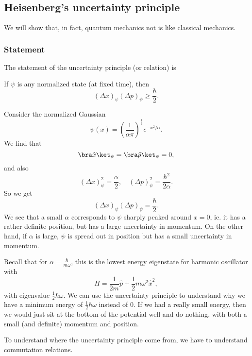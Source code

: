\documentclass[a4paper]{article}
\begin{document}
\subsection{Heisenberg's uncertainty principle}
We will show that, in fact, quantum mechanics not is like classical mechanics.

\subsubsection*{Statement}
The statement of the uncertainty principle (or relation) is
\begin{thm}
  If $\psi$ is any normalized state (at fixed time), then
  \[
    (\Delta x)_\psi (\Delta p)_\psi \geq \frac{\hbar}{2}.
  \]
\end{thm}

\begin{eg}
  Consider the normalized Gaussian
  \[
    \psi(x) = \left(\frac{1}{\alpha \pi}\right)^{\frac{1}{4}} e^{-x^2/\alpha}.
  \]
  We find that
  \[
    \bra \hat{x}\ket_\psi = \bra \hat{p}\ket_\psi = 0,
  \]
  and also
  \[
    (\Delta x)_\psi^2 = \frac{\alpha}{2},\quad (\Delta p)_\psi^2 = \frac{\hbar^2}{2\alpha}.
  \]
  So we get
  \[
    (\Delta x)_\psi(\Delta p)_\psi = \frac{\hbar}{2}.
  \]
  We see that a small $\alpha$ corresponds to $\psi$ sharply peaked around $x = 0$, ie. it has a rather definite position, but has a large uncertainty in momentum. On the other hand, if $\alpha$ is large, $\psi$ is spread out in position but has a small uncertainty in momentum.
\end{eg}
Recall that for $\alpha = \frac{\hbar}{m\omega}$, this is the lowest energy eigenstate for harmonic oscillator with
\[
  H = \frac{1}{2m}\hat{p} + \frac{1}{2}m\omega^2 \hat{x}^2,
\]
with eigenvalue $\frac{1}{2}\hbar \omega$. We can use the uncertainty principle to understand why we have a minimum energy of $\frac{1}{2}\hbar \omega$ instead of $0$. If we had a really small energy, then we would just sit at the bottom of the potential well and do nothing, with both a small (and definite) momentum and position.

To understand where the uncertainty principle come from, we have to understand commutation relations.
\end{document}
